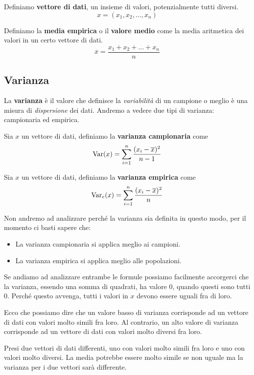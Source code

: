 \begin{definition} \label{vettore}
	Definiamo \textbf{vettore di dati}, un insieme di valori, potenzialmente tutti diversi.
	\[ x = (x_1, x_2, \dots, x_n) \]
\end{definition}

\begin{definition}
	Definiamo la \textbf{media empirica} o il \textbf{valore medio} come la media aritmetica dei valori in un certo
	vettore di dati.
	\[ \overline{x} = \frac{x_1 + x_2 + \dots + x_n}{n} \]
\end{definition}

\subsection{Varianza}
La \textbf{varianza} è il valore che definisce la \emph{variabilità} di un campione o meglio è una misura di
\emph{dispersione} dei dati. Andremo a vedere due tipi di varianza: campionaria ed empirica.

\begin{definition}
	Sia $x$ un vettore di dati, definiamo la \textbf{varianza campionaria} come
	\[ \operatorname{Var}(x) = \sum_{i=1}^n \frac{(x_i - \overline{x})^2}{n - 1} \]
\end{definition}

\begin{definition}
	Sia $x$ un vettore di dati, definiamo la \textbf{varianza empirica} come
	\[ \operatorname{Var}_e(x) = \sum_{i=1}^n \frac{(x_i - \overline{x})^2}{n} \]
\end{definition}

Non andremo ad analizzare perché la varianza sia definita in questo modo, per il momento ci basti sapere che:
\begin{itemize}
	\item La varianza campionaria si applica meglio ai campioni.
	\item La varianza empirica si applica meglio alle popolazioni.
\end{itemize}

\begin{observation}
	Se andiamo ad analizzare entrambe le formule possiamo facilmente accorgerci che la varianza, essendo una somma di
	quadrati, ha valore 0, quando questi sono tutti 0. Perché questo avvenga, tutti i valori in $x$ devono essere
	uguali fra di loro.

	Ecco che possiamo dire che un valore basso di varianza corrisponde ad un vettore di dati con valori molto simili
	fra loro. Al contrario, un alto valore di varianza corrisponde ad un vettore di dati con valori molto diversi fra
	loro.

	Presi due vettori di dati differenti, uno con valori molto simili fra loro e uno con valori molto diversi. La
	media potrebbe essere molto simile se non uguale ma la varianza per i due vettori sarà differente.
\end{observation}


